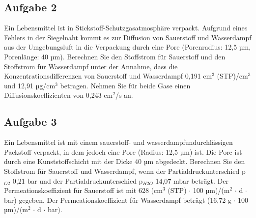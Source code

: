 \documentclass[a4paper,11pt]{article}
\newif\ifshowme
\begin{document}
\subsection*{Aufgabe 2}
Ein Lebensmittel ist in Stickstoff-Schutzgasatmosphäre verpackt. Aufgrund eines Fehlers in
der Siegelnaht kommt es zur Diffusion von Sauerstoff und Wasserdampf aus der
Umgebungsluft in die Verpackung durch eine Pore (Porenradius: 12,5 µm, Porenlänge: 40
µm). Berechnen Sie den Stoffstrom für Sauerstoff und den Stoffstrom für Wasserdampf unter
der Annahme, dass die Konzentrationsdifferenzen von Sauerstoff und Wasserdampf 0,191 cm$^3$ (STP)/cm$^3$ und 12,91 µg/cm$^3$ betragen. Nehmen Sie für beide Gase einen Diffusionskoeffizienten von 0,243 cm$^2$/s an. 




\ifshowme
\antwort{
\textbf{Sauerstoff:}
\begin{align*}
\dot{n} &= D \cdot A \cdot \frac{\Delta c}{l} \\
		&= 0,243 ~\text{cm}^2/\text{s} \cdot (\pi \cdot (1,25 \cdot 10^{-3}~\text{cm})^2) \cdot \frac{0,191 ~\text{cm}^3 \text{/cm$^3$}}{4 \cdot 10^{-3}~\text{cm} } \\
		&= 5,69 \cdot 10^{-5} ~\text{cm$^3$/s}
\end{align*}



\textbf{Wasser:}
\begin{align*}
\dot{n} &= D \cdot A \cdot \frac{\Delta c}{l} \\
		&= 0,243 ~\text{cm}^2/\text{s} \cdot (\pi \cdot (1,25 \cdot 10^{-3}~\text{cm})^2) \cdot \frac{1,291 \cdot 10^{-5} ~\text{g}\text{/cm$^3$}}{4 \cdot 10^{-3}~\text{cm} } \\
		&= 3,85 \cdot 10^{-9} ~\text{g/s}
\end{align*}
}
\pagebreak
\else
\fi



\subsection*{Aufgabe 3}
Ein Lebensmittel ist mit einem sauerstoff- und wasserdampfundurchlässigen Packstoff
verpackt, in dem jedoch eine Pore (Radius: 12,5 µm) ist. Die Pore ist durch eine
Kunststoffschicht mit der Dicke 40 µm abgedeckt. Berechnen Sie den Stoffstrom für
Sauerstoff und Wasserdampf, wenn der Partialdruckunterschied p$_{O2}$ 0,21 bar und der
Partialdruckunterschied p$_{H2O}$ 14,07 mbar beträgt. Der Permeationskoeffizient für Sauerstoff ist mit 628 (cm$^3$ (STP) $\cdot$ 100 µm)/(m$^2$ $\cdot$ d $\cdot$ bar) gegeben. Der Permeationskoeffizient für Wasserdampf beträgt (16,72 g $\cdot$ 100 µm)/(m$^2$ $\cdot$ d $\cdot$ bar).
\end{document}

